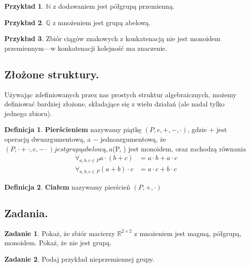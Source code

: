 \documentclass{article}
\theoremstyle{definition}
\newtheorem{definition}{Definicja}[section]
\newtheorem{example}{Przykład}[section]
\newtheorem{exercise}{Zadanie}[section]
\begin{document}
\begin{example}
	$\mathbb{N}$ z dodawaniem jest półgrupą przemienną.
\end{example}

\begin{example}
	$\mathbb{Q}$ z mnożeniem jest grupą abelową.
\end{example}

\begin{example}
	Zbiór ciągów znakowych z konkatenacją nie jest monoidem przemiennym---w konkatenacji kolejność ma znaczenie.
\end{example}

\subsection{Złożone struktury.}
Używając zdefiniowanych przez nas prostych struktur algebraicznych,
możemy definiować bardziej złożone,
składające się z wielu działań (ale nadal tylko jednego zbioru).

\begin{definition}
	\textbf{Pierścieniem} nazywamy piątkę $(P, e, +, -, \cdot)$,
		gdzie $+$ jest operacją dwuargumentową,
		a $-$ jednoargumentową,
		że $(P, \cdot+\cdot, e, -\cdot) jest grupą abelową,
		a $(P, \cdot) jest monoidem,
		oraz zachodzą równania
		\begin{align}
			\forall_{a, b, c \in P} a \cdot (b + c) &= a \cdot b + a \cdot c \\
			\forall_{a, b, c \in P} (a + b) \cdot c &= a \cdot c + b \cdot c
		\end{align}
\end{definition}

\begin{definition}
	\textbf{Ciałem} nazywamy pierścień $(P, +, \cdot)$
\end{definition}

\subsection{Zadania.}

\begin{exercise}
	Pokaż, że zbiór macierzy $\mathbb{R}^{2 \times 2}$ z mnożeniem
		jest magmą, półgrupą, monoidem.
	Pokaż, że nie jest grupą.
\end{exercise}

\begin{exercise}
	Podaj przykład nieprzemiennej grupy.
\end{exercise}
\end{document}
